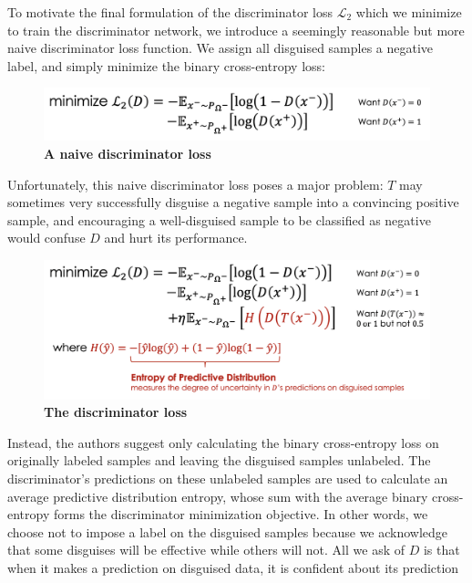 \documentclass{proc}
\begin{document}
To motivate the final formulation of the discriminator loss $\mathcal{L}_2$ which we minimize to train the discriminator network, we introduce a seemingly reasonable but more naive discriminator loss function. We assign all disguised samples a negative label, and simply minimize the binary cross-entropy loss:

\begin{figure}[h!]
		\includegraphics*[scale=0.23]{../figures/discriminator-loss-naive.png}
		\caption{\textbf{A naive discriminator loss}}
		\label{fig:discriminator-loss-naive}
\end{figure}

Unfortunately, this naive discriminator loss poses a major problem: $T$ may sometimes very successfully disguise a negative sample into a convincing positive sample, and encouraging a well-disguised sample to be classified as negative would confuse $D$ and hurt its performance.

\begin{figure}[h!]
		\includegraphics*[scale=0.24]{../figures/discriminator-loss.png}
		\caption{\textbf{The discriminator loss}}
		\label{fig:discriminator-loss}
\end{figure}

Instead, the authors suggest only calculating the binary cross-entropy loss on originally labeled samples and leaving the disguised samples unlabeled. The discriminator's predictions on these unlabeled samples are used to calculate an average predictive distribution entropy, whose sum with the average binary cross-entropy forms the discriminator minimization objective. In other words, we choose not to impose a label on the disguised samples because we acknowledge that some disguises will be effective while others will not. All we ask of $D$ is that when it makes a prediction on disguised data, it is confident about its prediction
\end{document}
